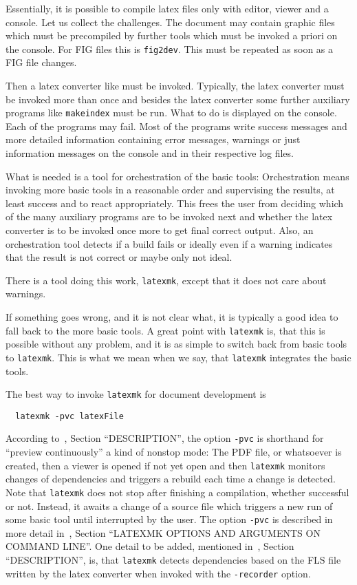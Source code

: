 Essentially, it is possible to compile latex files only with editor, viewer and a console. 
Let us collect the challenges. 
The document may contain graphic files which must be precompiled by further tools 
which must be invoked a priori on the console. 
For FIG files this is \texttt{fig2dev}. 
This must be repeated as soon as a FIG file changes. 

Then a latex converter like \lualatex{} must be invoked. 
Typically, the latex converter must be invoked more than once 
and besides the latex converter 
some further auxiliary programs like \texttt{makeindex} must be run. 
What to do is displayed on the console. 
Each of the programs may fail. 
Most of the programs write success messages and more detailed information 
containing error messages, warnings or just information messages 
on the console and in their respective log files. 

What is needed is a tool for orchestration of the basic tools: 
Orchestration means invoking more basic tools in a reasonable order 
and supervising the results, at least success and to react appropriately. 
This frees the user from deciding 
which of the many auxiliary programs are to be invoked next 
and whether the latex converter is to be invoked once more 
to get final correct output. 
Also, an orchestration tool detects if a build fails 
or ideally even if a warning indicates 
that the result is not correct or maybe only not ideal. 

There is a tool doing this work, \texttt{latexmk}, 
except that it does not care about warnings. 

If something goes wrong, and it is not clear what, 
it is typically a good idea to fall back to the more basic tools. 
A great point with \texttt{latexmk} is, that this is possible without any problem, 
and it is as simple to switch back from basic tools to \texttt{latexmk}. 
This is what we mean when we say, that \texttt{latexmk} integrates the basic tools. 

The best way to invoke \texttt{latexmk} for document development is 
%
\begin{Verbatim}
  latexmk -pvc latexFile
\end{Verbatim}

According to~\cite{LatexMk23}, Section ``DESCRIPTION'', 
the option \texttt{-pvc} is shorthand for ``preview continuously'' a kind of nonstop mode: 
The PDF file, or whatsoever is created, 
then a viewer is opened if not yet open 
and then \texttt{latexmk} monitors changes of dependencies 
and triggers a rebuild each time a change is detected. 
Note that \texttt{latexmk} does not stop after finishing a compilation, 
whether successful or not. 
Instead, it awaits a change of a source file which triggers a new run of some basic tool 
until interrupted by the user. 
The option \texttt{-pvc} is described in more detail 
in~\cite{LatexMk23}, Section ``LATEXMK OPTIONS AND ARGUMENTS ON COMMAND LINE''. 
One detail to be added, mentioned in~\cite{LatexMk23}, Section ``DESCRIPTION'', is, 
that \texttt{latexmk} detects dependencies 
based on the FLS file written by the latex converter 
when invoked with the \texttt{-recorder} option. 

